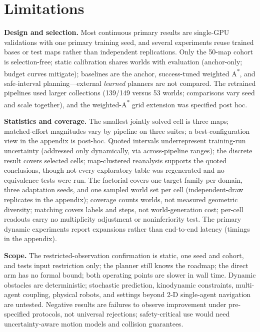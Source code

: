 \documentclass[letterpaper]{article} %
\begin{document}
\section{Limitations}

\textbf{Design and selection.} Most continuous primary results are single-GPU validations with one primary training seed, and several experiments reuse trained bases or test maps rather than independent replications. Only the 50-map cohort is selection-free; static calibration shares worlds with evaluation (anchor-only; budget curves mitigate); baselines are the anchor, success-tuned weighted A\textsuperscript{*}, and safe-interval planning---external \emph{learned} planners are not compared. The retrained pipelines used larger collections (139/149 versus 53 worlds; comparisons vary seed and scale together), and the weighted-A\textsuperscript{*} grid extension was specified post hoc.

\textbf{Statistics and coverage.} The smallest jointly solved cell is three maps; matched-effort magnitudes vary by pipeline on three suites; a best-configuration view in the appendix is post-hoc. Quoted intervals underrepresent training-run uncertainty (addressed only dynamically, via across-pipeline ranges); the discrete result covers selected cells; map-clustered reanalysis supports the quoted conclusions, though not every exploratory table was regenerated and no equivalence tests were run. The factorial covers one target family per domain, three adaptation seeds, and one sampled world set per cell (independent-draw replicates in the appendix); coverage counts worlds, not measured geometric diversity; matching covers labels and steps, not world-generation cost; per-cell readouts carry no multiplicity adjustment or noninferiority test. The primary dynamic experiments report expansions rather than end-to-end latency (timings in the appendix).

\textbf{Scope.} The restricted-observation confirmation is static, one seed and cohort, and tests input restriction only; the planner still knows the roadmap; the direct arm has no formal bound; both operating points are slower in wall time. Dynamic obstacles are deterministic; stochastic prediction, kinodynamic constraints, multi-agent coupling, physical robots, and settings beyond 2-D single-agent navigation are untested. Negative results are failures to observe improvement under pre-specified protocols, not universal rejections; safety-critical use would need uncertainty-aware motion models and collision guarantees.
\end{document}
